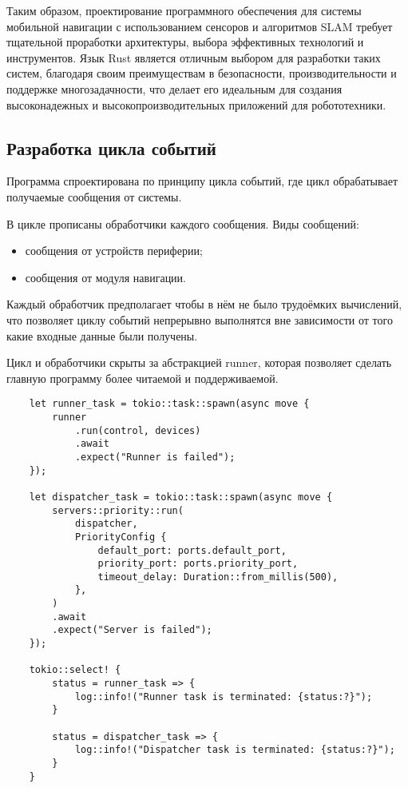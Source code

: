 Таким образом, проектирование программного обеспечения для системы мобильной
навигации с использованием сенсоров и алгоритмов SLAM требует тщательной
проработки архитектуры, выбора эффективных технологий и инструментов. Язык Rust
является отличным выбором для разработки таких систем, благодаря своим
преимуществам в безопасности, производительности и поддержке многозадачности,
что делает его идеальным для создания высоконадежных и высокопроизводительных
приложений для робототехники.

\subsection{Разработка цикла событий}

Программа спроектирована по принципу цикла событий, где цикл обрабатывает
получаемые сообщения от системы.

В цикле прописаны обработчики каждого сообщения.
Виды сообщений:
\begin{itemize}
	\item сообщения от устройств периферии;
	\item сообщения от модуля навигации.
\end{itemize}

Каждый обработчик предполагает чтобы в нём не было трудоёмких вычислений, что
позволяет циклу событий непрерывно выполнятся вне зависимости от того какие
входные данные были получены.

Цикл и обработчики скрыты за абстракцией runner, которая позволяет сделать
главную программу более читаемой и поддерживаемой.
\begin{lstlisting}
    let runner_task = tokio::task::spawn(async move {
        runner
            .run(control, devices)
            .await
            .expect("Runner is failed");
    });

    let dispatcher_task = tokio::task::spawn(async move {
        servers::priority::run(
            dispatcher,
            PriorityConfig {
                default_port: ports.default_port,
                priority_port: ports.priority_port,
                timeout_delay: Duration::from_millis(500),
            },
        )
        .await
        .expect("Server is failed");
    });

    tokio::select! {
        status = runner_task => {
            log::info!("Runner task is terminated: {status:?}");
        }

        status = dispatcher_task => {
            log::info!("Dispatcher task is terminated: {status:?}");
        }
    }
\end{lstlisting}

